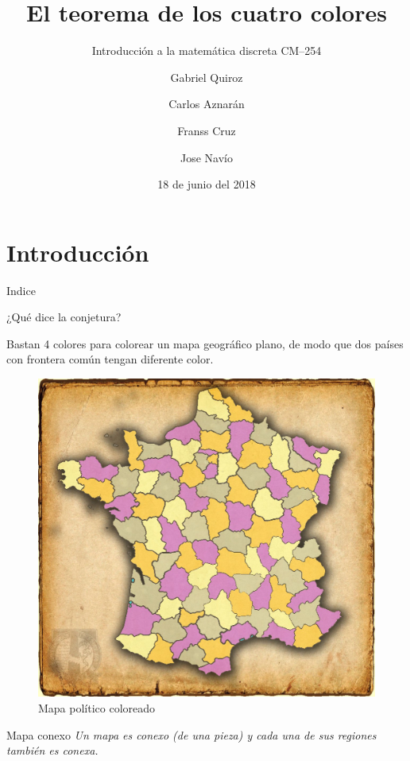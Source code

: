 \documentclass[spanish,utf8]{beamer}
\title{El teorema de los cuatro colores}
\subtitle{Introducción a la matemática discreta CM--254}
\author{Gabriel Quiroz \and Carlos Aznarán \and Franss Cruz \and Jose Navío}
\institute[UNI]{Universidad Nacional de Ingeniería}
\date{18 de junio del 2018}
\begin{document}
\maketitle
\section{Introducción}

\begin{frame}{Indice}
\tableofcontents    
\end{frame}

\begin{frame}{¿Qué dice la conjetura?}
\begin{block}{}
Bastan 4 colores para colorear un mapa geográfico
plano, de modo que dos países con frontera común
tengan diferente color.
\end{block}

\begin{minipage}[c]{5cm}
\begin{figure}
    \centering
    \includegraphics[scale=0.08]{mapa-4-colores_HR.jpg}
    \caption{Mapa político coloreado}
\end{figure}
\end{minipage}
\begin{minipage}[c]{5cm}
\begin{block}{Mapa conexo}
\emph{ Un mapa es conexo (de una pieza) y cada una de sus regiones también es conexa.}
\end{block}
\end{minipage}
\end{frame}
\end{document}
